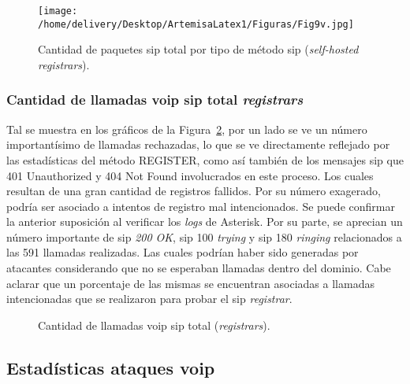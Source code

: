 \documentclass[a4paper,12pt]{report}
\begin{document}
{\begin{figure}[h!] 
\centering
\texttt{[image: /home/delivery/Desktop/ArtemisaLatex1/Figuras/Fig9v.jpg]}
\caption{Cantidad de paquetes \ac{sip} total por tipo de método \ac{sip}
(\emph{self-hosted} \emph{registrars}).}
\label{cant_paq_sip_x_metodo_torta_reg_sh}
\end{figure}

\clearpage

\subsubsection{Cantidad de llamadas \ac{voip} \ac{sip} total \emph{registrars}}
Tal se muestra en los gráficos de la Figura~\ref{cant_llamadas_sip_reg}, 
por un lado se ve un número importantísimo de llamadas
rechazadas, lo que se ve directamente reflejado por las estadísticas del método REGISTER, como así
también de los mensajes \ac{sip} que 401 Unauthorized y 404 Not Found involucrados en
este proceso. Los cuales resultan de una gran cantidad de registros fallidos.
Por su número exagerado, podría ser asociado a intentos de registro mal
intencionados. Se puede confirmar la anterior suposición al verificar los
\emph{logs} de Asterisk. Por su parte, se aprecian un número importante de \ac{sip} \emph{200 OK},
\ac{sip} 100 \emph{trying} y \ac{sip} 180 \emph{ringing} relacionados a las 591 llamadas realizadas. Las
cuales podrían haber sido generadas por atacantes considerando que no se
esperaban llamadas dentro del dominio. Cabe aclarar que un porcentaje de las
mismas se encuentran asociadas a llamadas intencionadas que se realizaron para
probar el \ac{sip} \emph{registrar}.

\begin{figure}[h!]
 \centering
 \caption{Cantidad de llamadas \ac{voip} \ac{sip} total (\emph{registrars}).}
\label{cant_llamadas_sip_reg}
\end{figure}

\subsection{Estadísticas ataques \ac{voip}}

}
\end{document}
